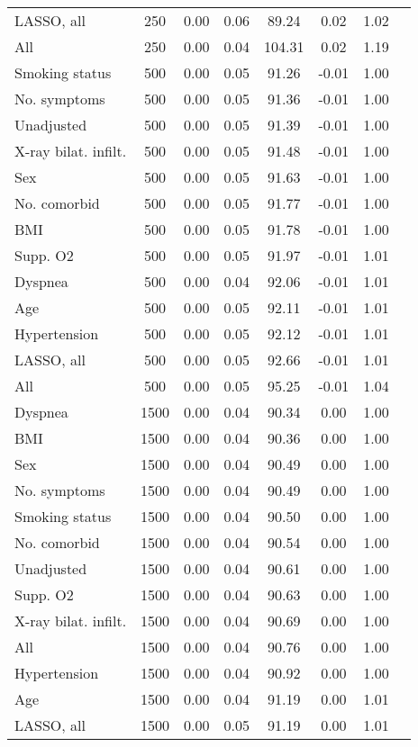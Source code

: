 \documentclass{article}
\begin{document}
{\begin{longtable}{lccccccc}
LASSO, all & 250 & 0.00 & 0.06 &  89.24 &  0.02 & 1.02 \\ 
All & 250 & 0.00 & 0.04 & 104.31 &  0.02 & 1.19 \\ \midrule 
Smoking status & 500 & 0.00 & 0.05 &  91.26 & -0.01 & 1.00 \\ 
No. symptoms & 500 & 0.00 & 0.05 &  91.36 & -0.01 & 1.00 \\ 
Unadjusted & 500 & 0.00 & 0.05 &  91.39 & -0.01 & 1.00 \\ 
X-ray bilat. infilt. & 500 & 0.00 & 0.05 &  91.48 & -0.01 & 1.00 \\ 
Sex & 500 & 0.00 & 0.05 &  91.63 & -0.01 & 1.00 \\ 
No. comorbid & 500 & 0.00 & 0.05 &  91.77 & -0.01 & 1.00 \\ 
BMI & 500 & 0.00 & 0.05 &  91.78 & -0.01 & 1.00 \\ 
Supp. O2 & 500 & 0.00 & 0.05 &  91.97 & -0.01 & 1.01 \\ 
Dyspnea & 500 & 0.00 & 0.04 &  92.06 & -0.01 & 1.01 \\ 
Age & 500 & 0.00 & 0.05 &  92.11 & -0.01 & 1.01 \\ 
Hypertension & 500 & 0.00 & 0.05 &  92.12 & -0.01 & 1.01 \\ 
LASSO, all & 500 & 0.00 & 0.05 &  92.66 & -0.01 & 1.01 \\ 
All & 500 & 0.00 & 0.05 &  95.25 & -0.01 & 1.04 \\ \midrule 
Dyspnea & 1500 & 0.00 & 0.04 &  90.34 &  0.00 & 1.00 \\ 
BMI & 1500 & 0.00 & 0.04 &  90.36 &  0.00 & 1.00 \\ 
Sex & 1500 & 0.00 & 0.04 &  90.49 &  0.00 & 1.00 \\ 
No. symptoms & 1500 & 0.00 & 0.04 &  90.49 &  0.00 & 1.00 \\ 
Smoking status & 1500 & 0.00 & 0.04 &  90.50 &  0.00 & 1.00 \\ 
No. comorbid & 1500 & 0.00 & 0.04 &  90.54 &  0.00 & 1.00 \\ 
Unadjusted & 1500 & 0.00 & 0.04 &  90.61 &  0.00 & 1.00 \\ 
Supp. O2 & 1500 & 0.00 & 0.04 &  90.63 &  0.00 & 1.00 \\ 
X-ray bilat. infilt. & 1500 & 0.00 & 0.04 &  90.69 &  0.00 & 1.00 \\ 
All & 1500 & 0.00 & 0.04 &  90.76 &  0.00 & 1.00 \\ 
Hypertension & 1500 & 0.00 & 0.04 &  90.92 &  0.00 & 1.00 \\ 
Age & 1500 & 0.00 & 0.04 &  91.19 &  0.00 & 1.01 \\ 
LASSO, all & 1500 & 0.00 & 0.05 &  91.19 &  0.00 & 1.01 \\
\bottomrule
\hline
\end{longtable}
}
\end{document}
